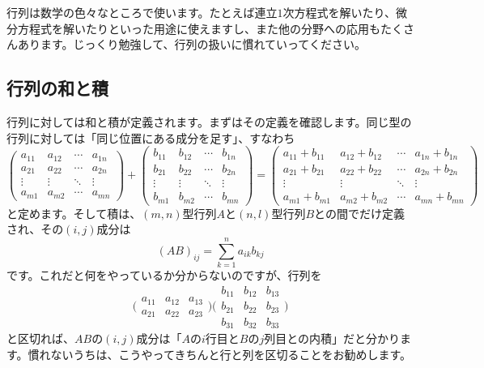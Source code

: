 行列は数学の色々なところで使います。たとえば連立$1$次方程式を解いたり、微分方程式を解いたりといった用途に使えますし、また他の分野への応用もたくさんあります。じっくり勉強して、行列の扱いに慣れていってください。

\subsection{行列の和と積}

行列に対しては和と積が定義されます。まずはその定義を確認します。同じ型の行列に対しては「同じ位置にある成分を足す」、すなわち
\[
\begin{pmatrix}
a_{11} & a_{12} & \cdots & a_{1n} \\
a_{21} & a_{22} & \cdots & a_{2n} \\
\vdots & \vdots & \ddots & \vdots \\
a_{m1} & a_{m2} & \cdots & a_{mn}
\end{pmatrix}
+
\begin{pmatrix}
b_{11} & b_{12} & \cdots & b_{1n} \\
b_{21} & b_{22} & \cdots & b_{2n} \\
\vdots & \vdots & \ddots & \vdots \\
b_{m1} & b_{m2} & \cdots & b_{mn}
\end{pmatrix}
=
\begin{pmatrix}
a_{11} + b_{11} & a_{12} + b_{12} & \cdots & a_{1n} + b_{1n} \\
a_{21} + b_{21} & a_{22} + b_{22} & \cdots & a_{2n} + b_{2n} \\
\vdots & \vdots & \ddots & \vdots \\
a_{m1} + b_{m1} & a_{m2} + b_{m2} & \cdots & a_{mn} + b_{mn}
\end{pmatrix}
\]
と定めます。そして積は、$(m,n)$型行列$A$と$(n,l)$型行列$B$との間でだけ定義され、その$(i,j)$成分は
\[
(AB)_{ij} = \sum_{k = 1}^n a_{ik}b_{kj}
\]
です。これだと何をやっているか分からないのですが、行列を
\[
\biggl(
\begin{array}{ccc}
a_{11} & a_{12} & a_{13} \\ \hline
a_{21} & a_{22} & a_{23} 
\end{array}
\biggr)
\Biggl(
\begin{array}{c|c|c}
b_{11} & b_{12} & b_{13} \\
b_{21} & b_{22} & b_{23} \\
b_{31} & b_{32} & b_{33}
\end{array}
\Biggr)
\]
と区切れば、$AB$の$(i,j)$成分は「$A$の$i$行目と$B$の$j$列目との内積」だと分かります。慣れないうちは、こうやってきちんと行と列を区切ることをお勧めします。

